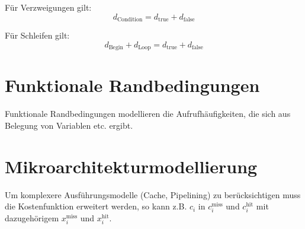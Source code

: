 Für Verzweigungen gilt:
\begin{equation}
    d_\text{Condition} = d_\text{true} + d_\text{false}
\end{equation}

Für Schleifen gilt:
\begin{equation}
    d_\text{Begin} + d_\text{Loop} = d_\text{true} + d_\text{false}
\end{equation}

\section{Funktionale Randbedingungen}
Funktionale Randbedingungen modellieren die Aufrufhäufigkeiten, die sich aus Belegung
von Variablen etc. ergibt.

\section{Mikroarchitekturmodellierung}
Um komplexere Ausführungsmodelle (Cache, Pipelining) zu berücksichtigen
muss die Kostenfunktion erweitert werden, so kann z.B. $c_i$ in $c_i^\text{miss}$
und $c_i^\text{hit}$ mit dazugehörigem $x_i^\text{miss}$ und $x_i^\text{hit}$.
